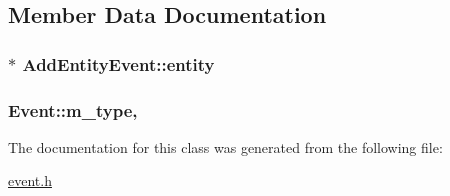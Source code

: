 \subsection{Member Data Documentation}
\hypertarget{classAddEntityEvent_a2c6f03064f943f33a2db0bf1438b0f93}{
\subsubsection[{entity}]{$\ast$ Add\-Entity\-Event\-::entity}}\label{classAddEntityEvent_a2c6f03064f943f33a2db0bf1438b0f93}
\hypertarget{classEvent_a38264e3fb229dc64123dff1d5a7dcf9e}{
\subsubsection[{m\-\_\-type}]{ Event\-::m\-\_\-type\hspace{0.3cm}{\ttfamily [protected]}, {\ttfamily [inherited]}}}\label{classEvent_a38264e3fb229dc64123dff1d5a7dcf9e}


The documentation for this class was generated from the following file\-:\begin{DoxyCompactItemize}
\item 
\hyperlink{event_8h}{event.\-h}\end{DoxyCompactItemize}
